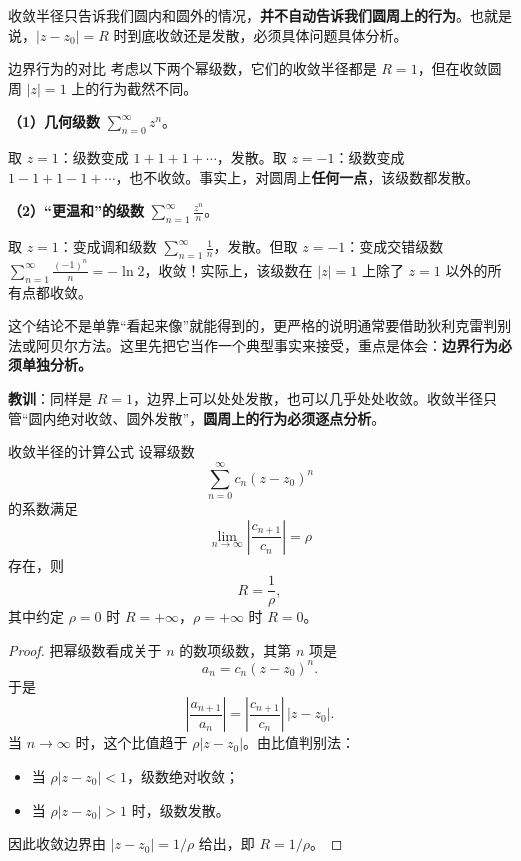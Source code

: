 \begin{jinshi}[边界点最容易出错]
收敛半径只告诉我们圆内和圆外的情况，\textbf{并不自动告诉我们圆周上的行为}。也就是说，$|z-z_0|=R$ 时到底收敛还是发散，必须具体问题具体分析。
\end{jinshi}

\begin{lizi}{边界行为的对比}{}
考虑以下两个幂级数，它们的收敛半径都是 $R=1$，但在收敛圆周 $|z|=1$ 上的行为截然不同。

\begin{jie}
\textbf{（1）几何级数} $\displaystyle\sum_{n=0}^{\infty} z^n$。

取 $z=1$：级数变成 $1+1+1+\cdots$，发散。取 $z=-1$：级数变成 $1-1+1-1+\cdots$，也不收敛。事实上，对圆周上\textbf{任何一点}，该级数都发散。

\textbf{（2）``更温和''的级数} $\displaystyle\sum_{n=1}^{\infty} \frac{z^n}{n}$。

取 $z=1$：变成调和级数 $\displaystyle\sum_{n=1}^{\infty} \frac{1}{n}$，发散。但取 $z=-1$：变成交错级数 $\displaystyle\sum_{n=1}^{\infty} \frac{(-1)^n}{n}=-\ln 2$，收敛！实际上，该级数在 $|z|=1$ 上除了 $z=1$ 以外的所有点都收敛。

这个结论不是单靠``看起来像''就能得到的，更严格的说明通常要借助狄利克雷判别法或阿贝尔方法。这里先把它当作一个典型事实来接受，重点是体会：\textbf{边界行为必须单独分析。}

\textbf{教训}：同样是 $R=1$，边界上可以处处发散，也可以几乎处处收敛。收敛半径只管``圆内绝对收敛、圆外发散''，\textbf{圆周上的行为必须逐点分析}。
\end{jie}
\end{lizi}

\begin{dingli}{收敛半径的计算公式}{}
设幂级数
\[
    \sum_{n=0}^{\infty} c_n (z-z_0)^n
\]
的系数满足
\[
    \lim_{n\to\infty}\left|\frac{c_{n+1}}{c_n}\right|=\rho
\]
存在，则
\[
    R=\frac{1}{\rho},
\]
其中约定 $\rho=0$ 时 $R=+\infty$，$\rho=+\infty$ 时 $R=0$。
\end{dingli}


\begin{proof}
把幂级数看成关于 $n$ 的数项级数，其第 $n$ 项是
\[
    a_n = c_n (z-z_0)^n.
\]
于是
\[
    \left|\frac{a_{n+1}}{a_n}\right|
    = \left|\frac{c_{n+1}}{c_n}\right|\,|z-z_0|.
\]
当 $n\to\infty$ 时，这个比值趋于 $\rho |z-z_0|$。由比值判别法：
\begin{itemize}
    \item 当 $\rho |z-z_0|<1$，级数绝对收敛；
    \item 当 $\rho |z-z_0|>1$ 时，级数发散。
\end{itemize}
因此收敛边界由 $|z-z_0|=1/\rho$ 给出，即 $R=1/\rho$。
\end{proof}

